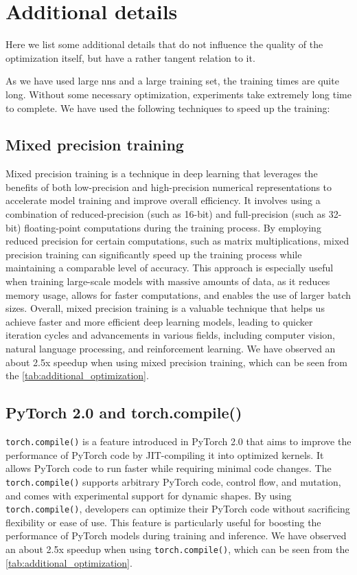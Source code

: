 \section{Additional details}

Here we list some additional details that do not influence the quality of the optimization itself, but have a rather
tangent relation to it.

As we have used large \glspl{nn} and a large training set, the training times are quite long. Without some necessary
optimization, experiments take extremely long time to complete. We have used the following techniques to speed up the
training:

\subsection{Mixed precision training}

Mixed precision training is a technique in deep learning that leverages the benefits of both low-precision and
high-precision numerical representations to accelerate model training and improve overall efficiency. It involves using
a combination of reduced-precision (such as 16-bit) and full-precision (such as 32-bit) floating-point computations
during the training process. By employing reduced precision for certain computations, such as matrix multiplications,
mixed precision training can significantly speed up the training process while maintaining a comparable level of
accuracy. This approach is especially useful when training large-scale models with massive amounts of data, as it
reduces memory usage, allows for faster computations, and enables the use of larger batch sizes. Overall, mixed
precision training is a valuable technique that helps us achieve faster and more efficient deep learning models, leading
to quicker iteration cycles and advancements in various fields, including computer vision, natural language processing,
and reinforcement learning. We have observed an about 2.5x speedup when using mixed precision training, which can be
seen from the \autoref{tab:additional_optimization}.

\subsection{PyTorch 2.0 and torch.compile()}

\verb|torch.compile()| is a feature introduced in PyTorch 2.0 \cite{pytorch} that aims to improve the performance of
PyTorch code by JIT-compiling it into optimized kernels. It allows PyTorch code to run faster while requiring minimal
code changes. The \verb|torch.compile()| supports arbitrary PyTorch code, control flow, and mutation, and comes with
experimental support for dynamic shapes. By using \verb|torch.compile()|, developers can optimize their PyTorch code
without sacrificing flexibility or ease of use.  This feature is particularly useful for boosting the performance of
PyTorch models during training and inference. We have observed an about 2.5x speedup when using \verb|torch.compile()|,
which can be seen from the \autoref{tab:additional_optimization}.

